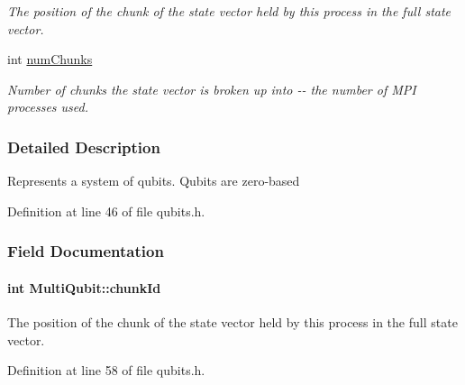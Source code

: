\begin{DoxyCompactItemize}
\begin{DoxyCompactList}\small\item\em The position of the chunk of the state vector held by this process in the full state vector. \item\end{DoxyCompactList}\item 
int \hyperlink{structMultiQubit_acd43f2f57991709c9e94f73662c972b2}{numChunks}
\begin{DoxyCompactList}\small\item\em Number of chunks the state vector is broken up into -\/-\/ the number of MPI processes used. \item\end{DoxyCompactList}\end{DoxyCompactItemize}


\subsubsection{Detailed Description}
Represents a system of qubits. Qubits are zero-\/based 

Definition at line 46 of file qubits.h.

\subsubsection{Field Documentation}
\hypertarget{structMultiQubit_ab10c88249fa3825d6227ceec01d37e37}{
\paragraph[{chunkId}]{\setlength{\rightskip}{0pt plus 5cm}int {\bf MultiQubit::chunkId}}\hfill}
\label{structMultiQubit_ab10c88249fa3825d6227ceec01d37e37}


The position of the chunk of the state vector held by this process in the full state vector. 

Definition at line 58 of file qubits.h.

